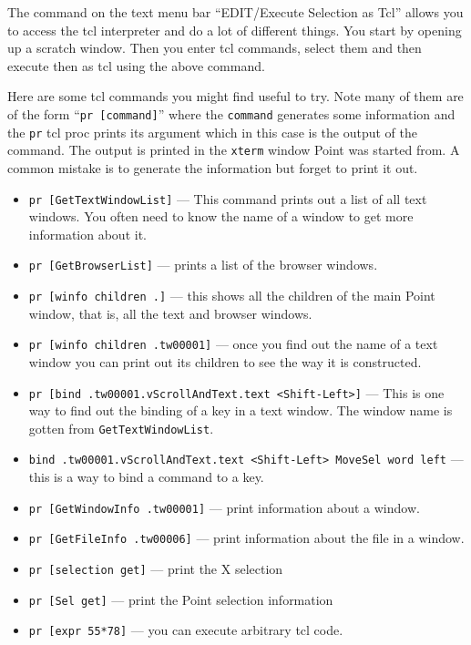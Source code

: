 The command on the text menu bar ``EDIT/Execute Selection as Tcl''
allows you to access the tcl interpreter and do a lot
of different things.
You start by opening up a scratch window.
Then you enter tcl commands, select them and then execute
then as tcl using the above command.

Here are some tcl commands you might find useful to try.
Note many of them are of the form ``{\tt pr [command]}''
where the {\tt command} generates some information and the
{\tt pr} tcl proc prints its argument which in this case is
the output of the command.
The output is printed in the {\tt xterm} window Point was
started from.
A common mistake is to generate the information but forget
to print it out.

\begin{itemize}
\item {\tt pr [GetTextWindowList]} ---
This command prints out a list of all text windows.
You often need to know the name of a window to get more
information about it.
\item {\tt pr [GetBrowserList]} --- prints a list of the browser windows.
\item {\tt pr [winfo children .]} --- this shows all the children of
the main Point window, that is, all the text and browser windows.
\item {\tt pr [winfo children .tw00001]} --- once you find out the
name of a text window you can print out its children to see the
way it is constructed.
\item {\tt pr [bind .tw00001.vScrollAndText.text <Shift-Left>]} ---
This is one way to find out the binding of a key in a text window.
The window name is gotten from {\tt GetTextWindowList}.
\item {\tt bind .tw00001.vScrollAndText.text <Shift-Left>
	{MoveSel word left}} --- this is a way to bind
	a command to a key.
\item {\tt pr [GetWindowInfo .tw00001]} --- print information
about a window.
\item {\tt pr [GetFileInfo .tw00006]} --- print information
about the file in a window.
\item {\tt pr [selection get]} --- print the X selection
\item {\tt pr [Sel get]} --- print the Point selection information
\item {\tt pr [expr 55*78]} --- you can execute arbitrary tcl code.
\end{itemize}




